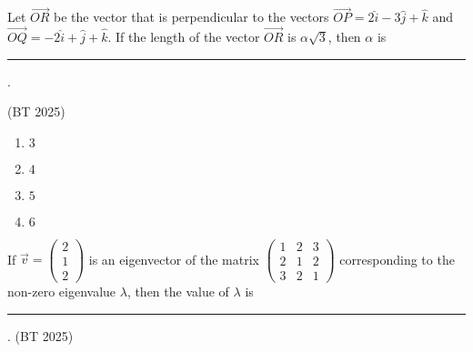 \item Let $\vec{OR}$ be the vector that is perpendicular to the vectors $\vec{OP}=2\hat{i}-3\hat{j}+\hat{k}$ and $\vec{OQ}=-2\hat{i}+\hat{j}+\hat{k}$. If the length of the vector $\vec{OR}$ is $\alpha\sqrt{3}$, then $\alpha$ is \rule{1cm}{0.01pt}.

\hfill(BT 2025)
\begin{multicols}{4}
\begin{enumerate}
    \item $3$
    \item $4$
    \item $5$
    \item $6$
\end{enumerate}
\end{multicols}
\item If $\vec{v}=\begin{pmatrix}2\\[2pt]1\\[2pt]2\end{pmatrix}$ is an eigenvector of the matrix
$\begin{pmatrix}
1 & 2 & 3\\
2 & 1 & 2\\
3 & 2 & 1
\end{pmatrix}$ corresponding to the non-zero eigenvalue $\lambda$, then the value of $\lambda$ is \rule{1cm}{0.01pt}.
\hfill (BT 2025)
